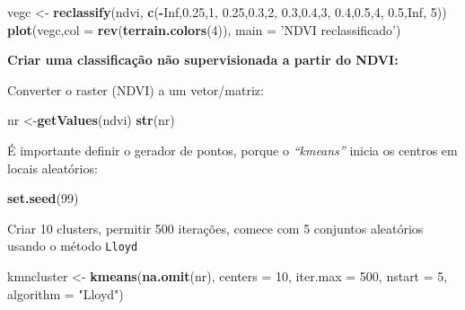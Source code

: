 \documentclass[
]{book}
\newenvironment{Shaded}{\begin{snugshade}}{\end{snugshade}}
\newcommand{\DataTypeTok}[1]{\textcolor[rgb]{0.13,0.29,0.53}{#1}}
\newcommand{\DecValTok}[1]{\textcolor[rgb]{0.00,0.00,0.81}{#1}}
\newcommand{\FloatTok}[1]{\textcolor[rgb]{0.00,0.00,0.81}{#1}}
\newcommand{\KeywordTok}[1]{\textcolor[rgb]{0.13,0.29,0.53}{\textbf{#1}}}
\newcommand{\NormalTok}[1]{#1}
\newcommand{\OperatorTok}[1]{\textcolor[rgb]{0.81,0.36,0.00}{\textbf{#1}}}
\newcommand{\OtherTok}[1]{\textcolor[rgb]{0.56,0.35,0.01}{#1}}
\newcommand{\StringTok}[1]{\textcolor[rgb]{0.31,0.60,0.02}{#1}}
\begin{document}
\begin{Shaded}
\begin{Highlighting}[]
\NormalTok{vegc <-}\StringTok{ }\KeywordTok{reclassify}\NormalTok{(ndvi, }\KeywordTok{c}\NormalTok{(}\OperatorTok{-}\OtherTok{Inf}\NormalTok{,}\FloatTok{0.25}\NormalTok{,}\DecValTok{1}\NormalTok{, }\FloatTok{0.25}\NormalTok{,}\FloatTok{0.3}\NormalTok{,}\DecValTok{2}\NormalTok{, }\FloatTok{0.3}\NormalTok{,}\FloatTok{0.4}\NormalTok{,}\DecValTok{3}\NormalTok{, }\FloatTok{0.4}\NormalTok{,}\FloatTok{0.5}\NormalTok{,}\DecValTok{4}\NormalTok{, }\FloatTok{0.5}\NormalTok{,}\OtherTok{Inf}\NormalTok{, }\DecValTok{5}\NormalTok{))}
\KeywordTok{plot}\NormalTok{(vegc,}\DataTypeTok{col =} \KeywordTok{rev}\NormalTok{(}\KeywordTok{terrain.colors}\NormalTok{(}\DecValTok{4}\NormalTok{)), }\DataTypeTok{main =} \StringTok{'NDVI reclassificado'}\NormalTok{)}
\end{Highlighting}
\end{Shaded}

\textbf{Criar uma classificação não supervisionada a partir do NDVI:}

Converter o raster (NDVI) a um vetor/matriz:

\begin{Shaded}
\begin{Highlighting}[]
\NormalTok{nr <-}\KeywordTok{getValues}\NormalTok{(ndvi)}
\KeywordTok{str}\NormalTok{(nr)}
\end{Highlighting}
\end{Shaded}

É importante definir o gerador de pontos, porque o \emph{``kmeans''} inicia os centros em locais aleatórios:

\begin{Shaded}
\begin{Highlighting}[]
\KeywordTok{set.seed}\NormalTok{(}\DecValTok{99}\NormalTok{)}
\end{Highlighting}
\end{Shaded}

Criar 10 clusters, permitir 500 iterações, comece com 5 conjuntos aleatórios usando o método \texttt{Lloyd}

\begin{Shaded}
\begin{Highlighting}[]
\NormalTok{kmncluster <-}\StringTok{ }\KeywordTok{kmeans}\NormalTok{(}\KeywordTok{na.omit}\NormalTok{(nr), }\DataTypeTok{centers =} \DecValTok{10}\NormalTok{, }\DataTypeTok{iter.max =} \DecValTok{500}\NormalTok{,}
                     \DataTypeTok{nstart =} \DecValTok{5}\NormalTok{, }\DataTypeTok{algorithm =} \StringTok{"Lloyd"}\NormalTok{)}
\end{Highlighting}
\end{Shaded}
\end{document}
